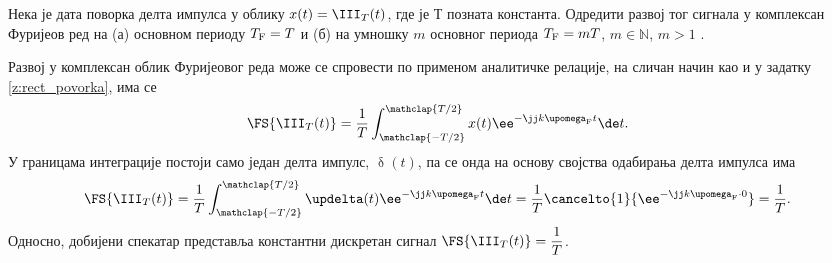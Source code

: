 \PID \label{z:dirak_povorka}
Нека је дата поворка делта импулса у облику $x(t) = \III_T(t)$, где је $Т$ позната константа. 
Одредити развој тог сигнала у комплексан Фуријеов ред 
на (а) основном периоду $T_{\rm F} = T$  и (б) на умношку $m$ основног периода $T_{\rm F} = mT$, $m \in \mathbb N$, $m > 1$ .

\RESENJE
Развој у комплексан облик Фуријеовог реда  може се спровести по применом аналитичке релације, на сличан начин као и у 
задатку \ref{z:rect_povorka}, има се 
\begin{eqnarray}
    \FS{\III_{T}(t)} = \dfrac{1}{T} 
    \int_{\mathclap{-T/2}}^{\mathclap{T/2}} x(t) \ee^{-\jj k \upomega_{\rm F} t} \de t. \label{\ID.e1}
\end{eqnarray}
У границама интеграције постоји само један делта импулс, $\updelta(t)$, па се онда на основу 
својства одабирања делта импулса има 
\begin{eqnarray}
    \FS{\III_{T}(t)} = \dfrac{1}{T} 
    \int_{\mathclap{-T/2}}^{\mathclap{T/2}} \updelta(t) \ee^{-\jj k \upomega_{\rm F} t} \de t = 
     \dfrac{1}{T} \cancelto{1}{\ee^{-\jj k \upomega_{\rm F} \cdot 0}} = \dfrac{1}{T}.
\end{eqnarray}
Односно, добијени спекатар представља константни дискретан сигнал $\FS{\III_{T}(t)} = \dfrac{1}{T}$. 

